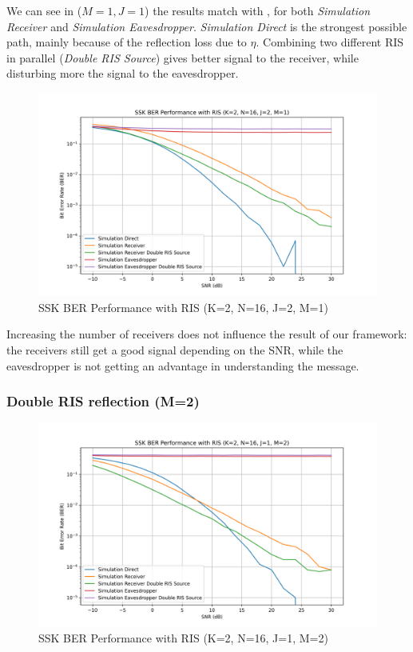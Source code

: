 We can see in ($M=1, J=1$) the results match with \cite{9328149}, for both \textit{Simulation Receiver} and \textit{Simulation Eavesdropper}.
\textit{Simulation Direct} is the strongest possible path, mainly because of the reflection loss due to $\eta$.
Combining two different RIS in parallel (\textit{Double RIS Source}) gives better signal to the receiver, while disturbing more the signal to the eavesdropper.

\begin{figure}[H]
  \centering
  \includegraphics[width=0.9\linewidth]{imgs/ber-simulations/SSK BER Performance with RIS (K=2, N=16, J=2, M=1).png}
  \caption{SSK BER Performance with RIS (K=2, N=16, J=2, M=1)}
  \label{fig:simulation_j2_m1}
\end{figure}

Increasing the number of receivers does not influence the result of our framework: the receivers still get a good signal depending on the SNR, while the eavesdropper is not getting an advantage in understanding the message.

\subsubsection{Double RIS reflection (M=2)}

\begin{figure}[H]
  \centering
  \includegraphics[width=0.9\linewidth]{imgs/ber-simulations/SSK BER Performance with RIS (K=2, N=16, J=1, M=2).png}
  \caption{SSK BER Performance with RIS (K=2, N=16, J=1, M=2)}
  \label{fig:simulation_j1_m2}
\end{figure}


